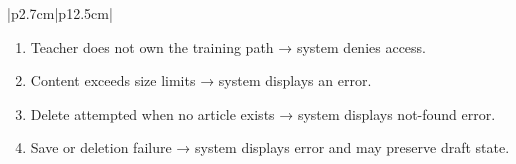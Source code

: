 \begin{table}[H]
\begin{tabular}{|p{2.7cm}|p{12.5cm}|}
\begin{minipage}[t]{\linewidth}
\begin{enumerate}[topsep=0pt,itemsep=1pt,parsep=0pt,partopsep=0pt]
                \item Teacher does not own the training path → system denies access.
                \item Content exceeds size limits → system displays an error.
                \item Delete attempted when no article exists → system displays not-found error.
                \item Save or deletion failure → system displays error and may preserve draft state.
            \end{enumerate}
        \end{minipage} \\
        \hline
    \end{tabular}
    \label{tab:teacher-manage-article}
\end{table}
 
